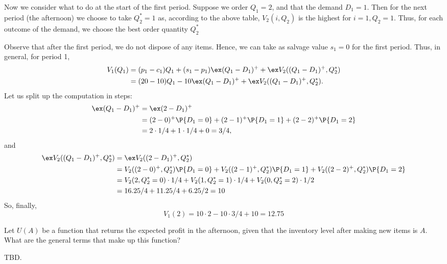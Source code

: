 \begin{question}
\begin{solution}
Now we consider what to do at the start of the first period. Suppose we order $Q_1=2$, and that the demand $D_1=1$. Then for the next period (the afternoon) we choose to take $Q_2^*=1$ as, according to the above table, $V_2(i, Q_2)$ is the highest for $i=1, Q_2=1$.  Thus, for each outcome of the demand, we choose the best order quantity $Q_2^*$

Observe that after the first period, we do not dispose of any items. Hence, we can take as salvage value $s_1=0$ for the first period.  Thus, in general, for period 1, 
\begin{equation*}
  \begin{split}
    V_1(Q_1) 
&= (p_1-c_1) Q_1 + (s_1-p_1)\ex (Q_1-D_1)^+ + \ex V_2((Q_1-D_1)^+, Q_2^*) \\
&= (20-10) Q_1 -10 \ex (Q_1-D_1)^+ + \ex V_2((Q_1-D_1)^+, Q_2^*).
  \end{split}
\end{equation*}
Let us split up the computation in steps: 
\begin{equation*}
  \begin{split}
\ex (Q_1-D_1)^+  
&= \ex(2-D_1)^+ \\
&= (2-0)^+ \P{D_1=0}
+(2-1)^+ \P{D_1=1}
+ (2-2)^+ \P{D_1=2} \\
&= 2\cdot 1/4 + 1 \cdot 1/4 + 0 = 3/4,
  \end{split}
\end{equation*}
and 
\begin{equation*}
  \begin{split}
    \ex V_2((Q_1-D_1)^+, Q_2^*) 
&=    \ex V_2((2-D_1)^+, Q_2^*) \\
&= 
V_2((2-0)^+, Q_2^*)\P{D_1=0}
+V_2((2-1)^+, Q_2^*)\P{D_1=1}
+V_2((2-2)^+, Q_2^*)\P{D_1=2} \\
&=
V_2(2, Q_2^*=0)\cdot 1/4
+V_2(1, Q_2^*=1)\cdot 1/4
+V_2(0, Q_2^*=2) \cdot 1/2 \\
&= 16.25 /4 + 11.25/4 + 6.25/2  = 10
  \end{split}
\end{equation*}
So, finally, 
\begin{equation*}
    V_1(2) = 10 \cdot 2 -10\cdot 3/4  + 10 = 12.75
\end{equation*}
\end{solution}

\end{question}

\begin{question}
Let $U(A)$ be a function that returns the expected profit in the afternoon, given that the inventory level after making new items is $A$. What are the general terms that make up this function?
   \begin{solution}
     TBD.
   \end{solution}
\end{question}

